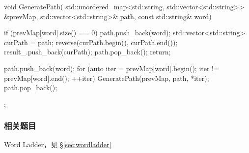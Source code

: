 \begin{Code}
{    void GeneratePath(
            std::unordered_map<std::string, std::vector<std::string>> &prevMap,
            std::vector<std::string>& path, const std::string& word) {
        if (prevMap[word].size() == 0) {
            path.push_back(word);
            std::vector<std::string> curPath = path;
            reverse(curPath.begin(), curPath.end());
            result_.push_back(curPath);
            path.pop_back();
            return;
        }

        path.push_back(word);
        for (auto iter = prevMap[word].begin(); iter != prevMap[word].end();
                ++iter) {
            GeneratePath(prevMap, path, *iter);
        }
        path.pop_back();
    }
};
\end{Code}


\subsubsection{相关题目}

\begindot
\item Word Ladder，见 \S \ref{sec:wordladder}
\myenddot
